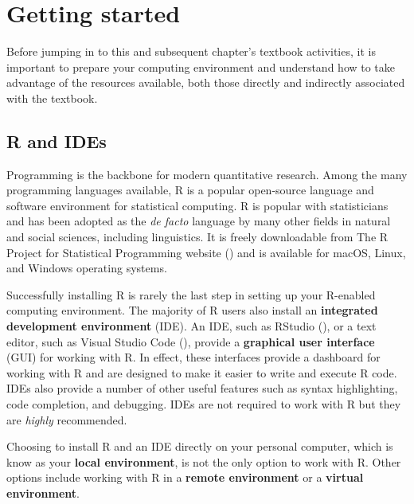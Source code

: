 \documentclass[
  letterpaper,
]{book}
\theoremstyle{definition}
\theoremstyle{remark}
\begin{document}
\section*{Getting started}\label{sec-preface-getting-started}


Before jumping in to this and subsequent chapter's textbook activities,
it is important to prepare your computing environment and understand how
to take advantage of the resources available, both those directly and
indirectly associated with the textbook.

\subsection*{R and IDEs}\label{sec-preface-r-ides}

Programming is the backbone for modern quantitative research. Among the
many programming languages available, R is a popular open-source
language and software environment for statistical computing. R is
popular with statisticians and has been adopted as the \emph{de facto}
language by many other fields in natural and social sciences, including
linguistics. It is freely downloadable from The R Project for
Statistical Programming website () and is available for macOS, Linux, and Windows
operating systems.

Successfully installing R is rarely the last step in setting up your
R-enabled computing environment. The majority of R users also install an
\textbf{integrated development environment} (IDE). An IDE, such as
RStudio (), or a text editor, such
as Visual Studio Code (),
provide a \textbf{graphical user interface} (GUI) for working with R. In
effect, these interfaces provide a dashboard for working with R and are
designed to make it easier to write and execute R code. IDEs also
provide a number of other useful features such as syntax highlighting,
code completion, and debugging. IDEs are not required to work with R but
they are \emph{highly} recommended.

Choosing to install R and an IDE directly on your personal computer,
which is know as your \textbf{local environment}, is not the only option
to work with R. Other options include working with R in a \textbf{remote
environment} or a \textbf{virtual environment}.
\end{document}
